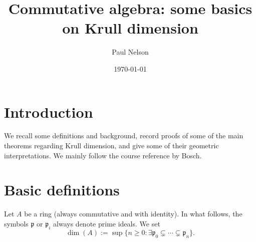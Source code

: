 \documentclass[10pt]{article}
\author{Paul Nelson}
\date{\today}
\title{Commutative algebra: some basics on Krull dimension}
\begin{document}
\maketitle
\tableofcontents

\section{Introduction}
\label{sec:org2573665}

We recall some definitions and background, record proofs of some
of the main theorems regarding Krull dimension, and give some of
their geometric interpretations.
We mainly follow the course reference by Bosch.

\section{Basic definitions}
\label{sec:orgdb2d3a0}

Let \(A\) be a ring (always commutative and with identity).
In what follows,
the symbols \(\mathfrak{p}\) or \(\mathfrak{p}_i\)
always denote prime ideals.
We set
\[
    \dim(A) :=
    \sup \{n \geq 0 : \exists \mathfrak{p}_0 \subsetneq \dotsb \subsetneq \mathfrak{p}_n \}.
  \]
\end{document}
